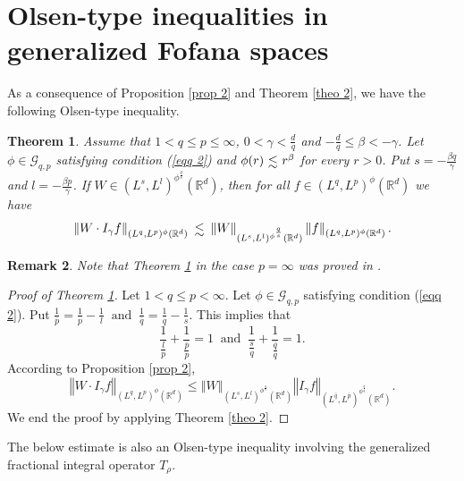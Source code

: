 \documentclass[a4paper,12pt,intlimits,oneside]{amsart}
\numberwithin{equation}{section}
\newtheorem{theorem}{Theorem}[section]
\newtheorem{remark}[theorem]{Remark}
\numberwithin{equation}{section}
\def\lsim{\raisebox{-1ex}{$~\stackrel{\textstyle <}{\sim}~$}}
\theoremstyle{definition}
\begin{document}
\section{Olsen-type inequalities in generalized Fofana spaces}
\label{S5}
As a consequence of Proposition \ref{prop 2} and Theorem \ref{theo 2}, we have the following Olsen-type inequality.
\begin{theorem}\label{theo 5}
Assume that $1 < q\leq p \leq \infty$, $ 0 < \gamma < \frac{d}{q}$ and $-\frac{d}{q} \leq \beta  < -\gamma $. Let $\phi\in \mathcal{G}_{q,p}$ satisfying condition (\ref{eqq 2}) and $\phi(r) \lsim  r^{\beta}$ for every $r > 0$. Put $s=-\frac{\beta q}{\gamma}$ and $l=-\frac{\beta p}{\gamma}$. If $W \in (L^{s},L^{l})^{\phi^{\frac{q}{s}}}(\mathbb{R}^{d})$, 
 then for all  $f \in (L^{q},L^{p})^{\phi}(\mathbb{R}^{d})$ we have
 $$\left\Vert W \cdot I_{\gamma}f \right\Vert_{(L^{q},L^{p})^{\phi}(\mathbb{R}^{d})} \lsim \left\Vert W  \right\Vert_{(L^{s},L^{l})^{\phi^{\frac{q}{s}}}(\mathbb{R}^{d})} \left\Vert f  \right\Vert_{(L^{q},L^{p})^{\phi}(\mathbb{R}^{d})}.$$ 
\end{theorem}
\begin{remark}
Note that Theorem \ref{theo 5} in the case $p=\infty$ was proved in \cite[Theorem 3.2]{GE}. 
\end{remark}
\begin{proof}[Proof of Theorem \ref{theo 5}]
 Let $1 < q\leq p < \infty$. Let $\phi\in \mathcal{G}_{q,p}$ satisfying condition (\ref{eqq 2}). Put $\frac{1}{\bar{p}} = \frac{1}{p} -\frac{1}{l} \: \text{ and } \: \frac{1}{\bar{q}} = \frac{1}{q} -\frac{1}{s}.$
This implies that $$ \frac{1}{\frac{l}{p}} +\frac{1}{\frac{\bar{p}}{p}} =  1 \: \text{ and } \: \frac{1}{\frac{s}{q}} +\frac{1}{\frac{\bar{q}}{q}} =  1.$$
According to Proposition \ref{prop 2}, 
 $$\left\Vert W \cdot I_{\gamma}f \right\Vert_{(L^{q},L^{p})^{\phi}(\mathbb{R}^{d})} \leq \left\Vert W  \right\Vert_{(L^{s},L^{l})^{\phi^{\frac{q}{s}}}(\mathbb{R}^{d})} \left\Vert I_{\gamma}f  \right\Vert_{(L^{\bar{q}},L^{\bar{p}})^{\phi^{\frac{q}{\bar{q}}}}(\mathbb{R}^{d})}.$$ 
We end the proof by applying Theorem \ref{theo 2}.
\end{proof}
The below estimate is also an Olsen-type inequality involving the generalized fractional integral operator $T_{\rho}$. 
\end{document}
